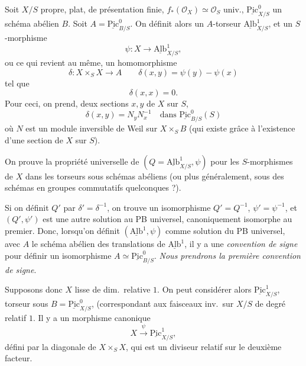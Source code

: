 \documentclass[11pt,a4paper]{article}
\begin{document}

Soit $X/S$ propre, plat, de présentation finie, $f_{*}(\mathcal{O}_X) \simeq
\mathcal{O}_S$ univ., $\underline{\mathrm{Pic}}^{0}_{X/S}$ un
schéma abélien $B$. Soit $A = \underline{\mathrm{Pic}}^{0}_{B/S}$. On définit
alors un  $A$-torseur $\underline{\mathrm{Alb}}^{1}_{X/S}$, et un
$S$-morphisme
\[
  \psi : X \longrightarrow \underline{\mathrm{Alb}}^{1}_{X/S} ,
\]
ou ce qui revient au même, un homomorphisme
\[
  \delta : X \times_S X \longrightarrow A \qquad \delta(x,y) = \psi(y) - \psi(x)
\]
tel que
\[
  \delta(x,x) = 0 .
\]
Pour ceci, on prend,  deux sections $x, y$ de $X$ sur $S$,
\[
  \delta(x,y) = N_y N_x^{-1} \quad \text{dans } \underline{\mathrm{Pic}}^{0}_{B/S}(S)
\]
où $N$ est un module inversible de Weil sur $X \times_S B$ (qui existe grâce
à l'existence d'une section de $X$ sur $S$).

On prouve la propriété universelle de $(Q = \underline{\mathrm{Alb}}^{1}_{X/S},
\psi)$ pour les $S$-morphismes de $X$ dans les  torseurs sous
schémas abéliens (ou plus généralement, sous des schémas en groupes
commutatifs quelconques ?).

Si on définit $Q'$ par $\delta' = \delta^{-1}$, on trouve un isomorphisme
$Q' = Q^{-1}$, $\psi' = \psi^{-1}$, et $(Q', \psi')$ est une autre solution
au \struck{\ill{}} PB universel, canoniquement isomorphe au premier. Donc,
lorsqu'on définit $(\underline{\mathrm{Alb}}^{1}, \psi)$ comme solution du PB
universel, avec $A$ le schéma abélien des translations de
$\underline{\mathrm{Alb}}^{1}$, il y a une \emph{convention de signe}
 pour définir un isomorphisme $A \simeq
\underline{\mathrm{Pic}}^{0}_{B/S}$. \emph{Nous prendrons la première
convention de signe}.


Supposons donc $X$ lisse de dim.\ relative $1$. On peut considérer alors
$\underline{\mathrm{Pic}}^{1}_{X/S}$, torseur sous $B =
\underline{\mathrm{Pic}}^{0}_{X/S}$, (correspondant aux faisceaux inv.\ sur
$X/S$ de degré relatif $1$. Il
y a un morphisme canonique
\[
  X \xrightarrow{\ \psi\ } \underline{\mathrm{Pic}}^{1}_{X/S} ,
\]
 défini par la diagonale de $X \times_S X$, qui est un
diviseur relatif sur le deuxième facteur.
\end{document}
